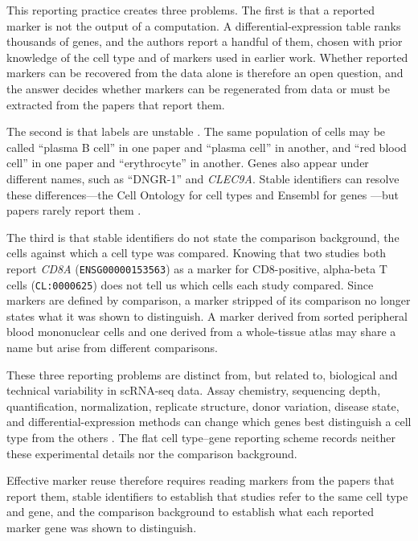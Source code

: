 \documentclass[10pt,twocolumn]{article}
\theoremstyle{plain}
\theoremstyle{definition}
\theoremstyle{remark}
\begin{document}


This reporting practice creates three problems. The first is that a reported marker is not the output of a computation. A differential-expression table ranks thousands of genes, and the authors report a handful of them, chosen with prior knowledge of the cell type and of markers used in earlier work. Whether reported markers can be recovered from the data alone is therefore an open question, and the answer decides whether markers can be regenerated from data or must be extracted from the papers that report them.

The second is that labels are unstable \citep{Miller2020CellNomenclature,OsumiSutherland2021CellOntologies}. The same population of cells may be called ``plasma B cell'' in one paper and ``plasma cell'' in another, and ``red blood cell'' in one paper and ``erythrocyte'' in another. Genes also appear under different names, such as ``DNGR-1'' and \textit{CLEC9A}. Stable identifiers can resolve these differences---the Cell Ontology for cell types and Ensembl for genes \citep{OsumiSutherland2021CellOntologies,Cunningham2022Ensembl}---but papers rarely report them \citep{Lubiana2022MIRACL}.

The third is that stable identifiers do not state the comparison background, the cells against which a cell type was compared. Knowing that two studies both report \textit{CD8A} (\texttt{ENSG00000153563}) as a marker for CD8-positive, alpha-beta T cells (\texttt{CL:0000625}) does not tell us which cells each study compared. Since markers are defined by comparison, a marker stripped of its comparison no longer states what it was shown to distinguish. A marker derived from sorted peripheral blood mononuclear cells and one derived from a whole-tissue atlas may share a name but arise from different comparisons.

These three reporting problems are distinct from, but related to, biological and technical variability in scRNA-seq data. Assay chemistry, sequencing depth, quantification, normalization, replicate structure, donor variation, disease state, and differential-expression methods can change which genes best distinguish a cell type from the others \citep{Heumos_2023,Soneson_2018,Squair_2021,Krzak2026CrohnReplicability}. The flat cell type--gene reporting scheme records neither these experimental details nor the comparison background.

Effective marker reuse therefore requires reading markers from the papers that report them, stable identifiers to establish that studies refer to the same cell type and gene, and the comparison background to establish what each reported marker gene was shown to distinguish.
\end{document}
